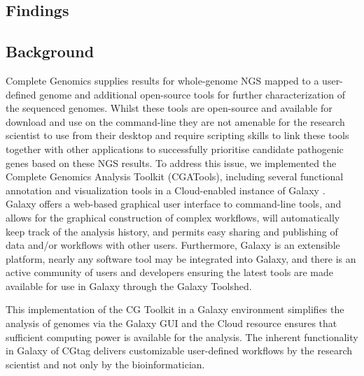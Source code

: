 \documentclass[10pt]{bmc_article}
\newenvironment{bmcformat}{\begin{raggedright}\baselineskip20pt\sloppy\setboolean{publ}{false}}{\end{raggedright}\baselineskip20pt\sloppy}
\begin{document}
\begin{bmcformat}
\section*{Findings }
\subsection*{Background}
Complete Genomics supplies results for whole-genome NGS mapped to a user-defined genome \cite{ma} and additional open-source tools \cite{url-cgatools} for further characterization of the sequenced genomes.  Whilst these tools are open-source and available for download and use on the command-line they are not amenable for the research scientist to use from their desktop and require scripting skills to link these tools together with other applications to successfully prioritise candidate pathogenic genes based on these NGS results.  To address this issue, we implemented the Complete Genomics Analysis Toolkit (CGATools), including several functional annotation and visualization tools in a Cloud-enabled instance of Galaxy \cite{drmanac}.  Galaxy offers a web-based graphical user interface to command-line tools, and allows for the graphical construction of complex workflows, will automatically keep track of the analysis history, and permits easy sharing and publishing of data and/or workflows with other users. Furthermore, Galaxy is an extensible platform, nearly any software tool may be integrated into Galaxy, and there is an active community of users and developers ensuring the latest tools are made available for use in Galaxy through the Galaxy Toolshed.

This implementation of the CG Toolkit in a Galaxy environment simplifies the analysis of genomes via the Galaxy GUI and the Cloud resource ensures that sufficient computing power is available for the analysis.  The inherent functionality in Galaxy of CGtag delivers customizable user-defined workflows by the research scientist and not only by the bioinformatician.   


\end{bmcformat}
\end{document}
